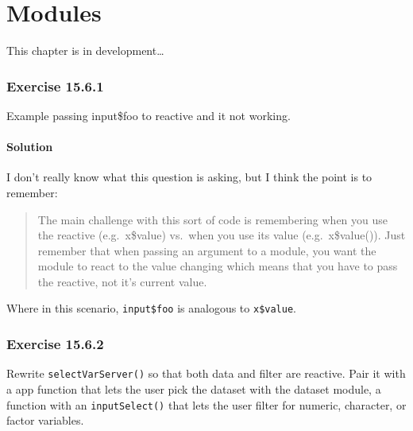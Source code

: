 \documentclass[]{book}
\begin{document}
\hypertarget{modules}{%
\chapter{Modules}\label{modules}}

\begin{TODO}

This chapter is in development\ldots{}

\end{TODO}

\hypertarget{exercise-15.6.1}{%
\subsection*{Exercise 15.6.1}\label{exercise-15.6.1}}

Example passing input\$foo to reactive and it not working.

\begin{solution}

\hypertarget{solution}{%
\subsubsection*{Solution}\label{solution}}

I don't really know what this question is asking, but I think the point is to remember:

\begin{quote}
The main challenge with this sort of code is remembering when you use the reactive (e.g.~x\$value) vs.~when you use its value (e.g.~x\$value()). Just remember that when passing an argument to a module, you want the module to react to the value changing which means that you have to pass the reactive, not it's current value.
\end{quote}

Where in this scenario, \texttt{input\$foo} is analogous to \texttt{x\$value}.

\end{solution}

\hypertarget{exercise-15.6.2}{%
\subsection*{Exercise 15.6.2}\label{exercise-15.6.2}}

Rewrite \texttt{selectVarServer()} so that both data and filter are reactive. Pair it with a app function that lets the user pick the dataset with the dataset module, a function with an \texttt{inputSelect()} that lets the user filter for numeric, character, or factor variables.
\end{document}
